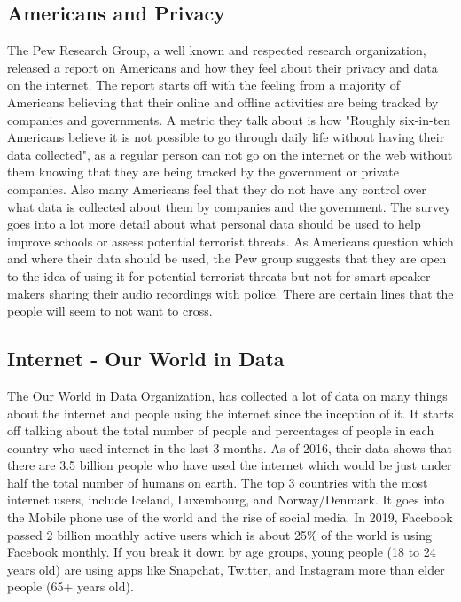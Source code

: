 \documentclass[10.5pt, twoside,twocolumn]{article}
\begin{document}
\subsection{Americans and Privacy}
The Pew Research Group, a well known and respected research organization, released a report on Americans and how they feel about their privacy and data on the internet. The report starts off with the feeling from a majority of Americans believing that their online and offline activities are being tracked by companies and governments. A metric they talk about is how "Roughly six-in-ten Americans believe it is not possible to go through daily life without having their data collected", as a regular person can not go on the internet or the web without them knowing that they are being tracked by the government or private companies. Also many Americans feel that they do not have any control over what data is collected about them by companies and the government. The survey goes into a lot more detail about what personal data should be used to help improve schools or assess potential terrorist threats. As Americans question which and where their data should be used, the Pew group suggests that they are open to the idea of using it for potential terrorist threats but not for smart speaker makers sharing their audio recordings with police. There are certain lines that the people will seem to not want to cross. 

\subsection{Internet - Our World in Data}
The Our World in Data Organization, has collected a lot of data on many things about the internet and people using the internet since the inception of it. It starts off talking about the total number of people and percentages of people in each country who used internet in the last 3 months. As of 2016, their data shows that there are 3.5 billion people who have used the internet which would be just under half the total number of humans on earth. The top 3 countries with the most internet users, include Iceland, Luxembourg, and Norway/Denmark. It goes into the Mobile phone use of the world and the rise of social media. In 2019, Facebook passed 2 billion monthly active users which is about 25\% of the world is using Facebook monthly. If you break it down by age groups, young people (18 to 24 years old) are using apps like Snapchat, Twitter, and Instagram more than elder people (65+ years old).
\end{document}

